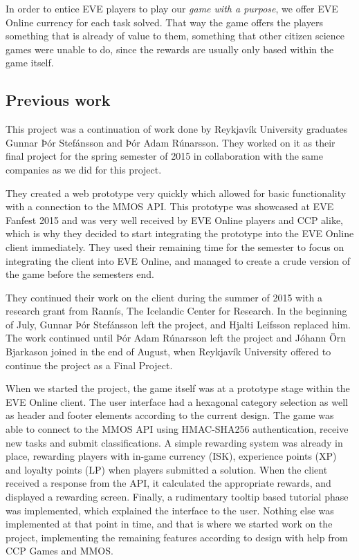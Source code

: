 	In order to entice EVE players to play our \emph{game with a purpose}, we offer EVE Online currency for each task solved. That way the game offers the players something that is already of value to them, something that other citizen science games were unable to do, since the rewards are usually only based within the game itself.

\subsection{Previous work}
	This project was a continuation of work done by Reykjavík University graduates Gunnar Þór Stefánsson and Þór Adam Rúnarsson. They worked on it as their final project for the spring semester of 2015 in collaboration with the same companies as we did for this project.

	They created a web prototype very quickly which allowed for basic functionality with a connection to the MMOS API. This prototype was showcased at EVE Fanfest 2015 \cite{fanfest} and was very well received by EVE Online players and CCP alike, which is why they decided to start integrating the prototype into the EVE Online client immediately. They used their remaining time for the semester to focus on integrating the client into EVE Online, and managed to create a crude version of the game before the semesters end.

	They continued their work on the client during the summer of 2015 with a research grant from Rannís, The Icelandic Center for Research. In the beginning of July, Gunnar Þór Stefánsson left the project, and Hjalti Leifsson replaced him. The work continued until Þór Adam Rúnarsson left the project and Jóhann Örn Bjarkason joined in the end of August, when Reykjavík University offered to continue the project as a Final Project.

	When we started the project, the game itself was at a prototype stage within the EVE Online client. The user interface had a hexagonal category selection as well as header and footer elements according to the current design. The game was able to connect to the MMOS API using HMAC-SHA256 authentication, receive new tasks and submit classifications. A simple rewarding system was already in place, rewarding players with in-game currency (ISK), experience points (XP) and loyalty points (LP) when players submitted a solution. When the client received a response from the API, it calculated the appropriate rewards, and displayed a rewarding screen. Finally, a rudimentary tooltip based tutorial phase was implemented, which explained the interface to the user. Nothing else was implemented at that point in time, and that is where we started work on the project, implementing the remaining features according to design with help from CCP Games and MMOS.